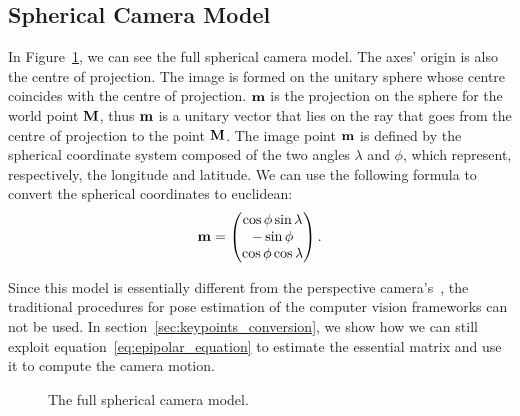 \subsection{Spherical Camera Model}
\label{subsec:spherical_camera_model}
In Figure~\ref{fig:camera_model}, we can see the full spherical camera model.
The axes' origin is also the centre of projection. The image is formed on 
the unitary sphere whose centre coincides with the centre of projection.
$\mathbf{m}$ is the projection on the sphere for the world point 
$\mathbf{M}$, thus $\mathbf{m}$ is a unitary vector that lies on the ray that goes
from the centre of projection to the point $\mathbf{M}$.
The image point $\mathbf{m}$ is defined by the spherical coordinate 
system composed of the two angles $\lambda$ and $\phi$, which represent, respectively, the 
longitude and latitude. 
We can use the following formula to convert the spherical coordinates to 
euclidean:
\begin{equation}
	\label{eq:ll2Cartesian_second}
	\mathbf{m} =
	\begin{pmatrix}
		\cos\phi\sin\lambda \\
		-\sin\phi \\
		\cos\phi\cos\lambda
	\end{pmatrix}	\text{.}
\end{equation}

Since this model is essentially different from the 
perspective camera's~\cite{szeliski2010computer}, the traditional procedures 
for pose estimation of the computer vision frameworks can not be used.
In section~\ref{sec:keypoints_conversion}, we show how we can still exploit
equation~\ref{eq:epipolar_equation} to estimate the essential matrix and use it
to compute the camera motion.

\begin{figure}[h]
    \centering
    \def\svgwidth{0.7\columnwidth}
    
    \caption{The full spherical camera model.}
	\label{fig:camera_model}
\end{figure}

